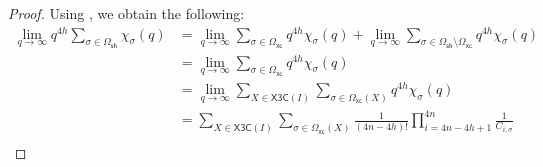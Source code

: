 \documentclass[11pt]{amsart}
\newcommand{\omsh}{\Omega_{\mathsf{sh}}}
\newcommand{\omxc}{\Omega_{\mathsf{xc}}}
\begin{document}
\begin{proof}
%    
%
%
%
Using , we obtain the following:
\begin{align*}
   \lim_{q \to \infty} q^{4h} \sum_{\sigma \in \omsh} \chi_{\sigma}(q)
    &=  \lim_{q \to \infty}\sum_{\sigma \in \omxc} q^{4h} \chi_{\sigma}(q) + \lim_{q \to \infty}\sum_{\sigma \in \omsh \setminus \omxc} q^{4h} \chi_{\sigma}(q)\\
    &= \lim_{q \to \infty}\sum_{\sigma \in \omxc} q^{4h} \chi_{\sigma}(q)\\
    &= \lim_{q \to \infty} \sum_{X \in \mathsf{X3C}(I)} \sum_{\sigma \in \omxc(X)} q^{4h} \chi_{\sigma}(q)\\
    &= \sum_{X \in \mathsf{X3C}(I)} \sum_{\sigma \in \omxc(X)} \frac{1}{(4n-4h)!} \prod_{i=4n-4h+1}^{4n}\frac{1}{C_{i,\sigma}}\\

\end{align*}
\end{proof}
\end{document}
